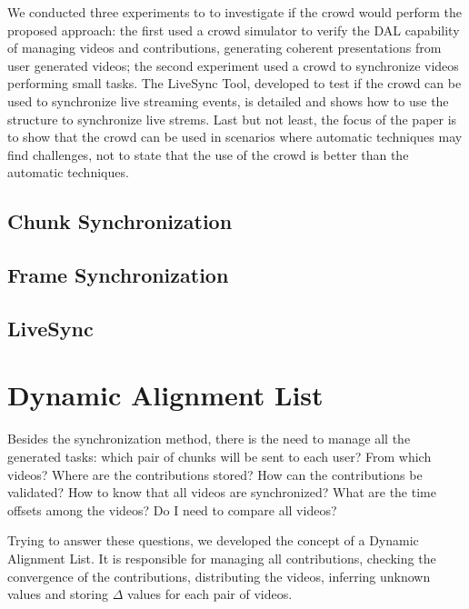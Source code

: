 \documentclass[sigconf]{acmart}
\begin{document}
We conducted three experiments to to investigate if the crowd would perform the proposed approach: the first used a crowd simulator to verify the DAL capability of managing videos and contributions, generating coherent presentations from user generated videos; the second experiment used a crowd to synchronize videos performing small tasks. The LiveSync Tool, developed to test if the crowd can be used to synchronize live streaming events, is detailed and shows how to use the structure to synchronize live strems. Last but not least, the focus of the paper is to show that the crowd can be used in scenarios where automatic techniques may find challenges, not to state that the use of the crowd is better than the automatic techniques.







\subsection{Chunk Synchronization}


\subsection{Frame Synchronization}







\subsection{LiveSync}



\section{Dynamic Alignment List}
Besides the synchronization method, there is the need to manage all the generated tasks: which pair of chunks will be sent to each user? From which videos? Where are the contributions stored? How can the contributions be validated? How to know that all videos are synchronized? What are the time offsets among the videos? Do I need to compare all videos?

Trying to answer these questions, we developed the concept of a  Dynamic Alignment List. It is responsible for managing all contributions, checking the convergence of the contributions, distributing the videos, inferring unknown values and storing $\Delta$ values for each pair of videos.
\end{document}
